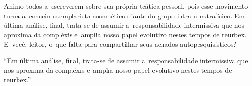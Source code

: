 \documentclass{gescons}
\begin{document}
\begin{multicols}{2}
Animo todos a~escreverem sobre sua própria teática pessoal, pois esse movimento torna a~conscin exemplarista cosmoética diante do grupo intra e~extrafísico. Em última análise, final, trata-se de assumir a~responsabilidade intermissiva que nos aproxima da compléxis e~amplia nosso papel evolutivo nestes tempos de reurbex. E~você, leitor, o~que falta para compartilhar seus achados autopesquisísticos?


\begin{pullquote}
    ``Em última análise, final, trata-se de assumir a~responsabilidade intermissiva que nos aproxima da compléxis e~amplia nosso papel evolutivo nestes tempos de reurbex.''
\end{pullquote}

    
    \end{multicols}
\end{document}
